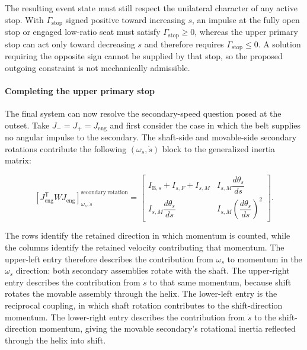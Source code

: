 \documentclass[11pt]{report}
\numberwithin{equation}{section}
\begin{document}
The resulting event state must still respect the unilateral character of
any active stop.  With \(\Gamma_{\mathrm{stop}}\) signed positive toward
increasing \(s\), an impulse at the fully open stop or engaged low-ratio
seat must satisfy
\(\Gamma_{\mathrm{stop}}\geq0\), whereas the upper primary stop can act
only toward decreasing \(s\) and therefore requires
\(\Gamma_{\mathrm{stop}}\leq0\).  A solution requiring the opposite sign
cannot be supplied by that stop, so the proposed outgoing constraint is
not mechanically admissible.

\paragraph{Completing the upper primary stop} The final system can now resolve the secondary-speed
question posed at the outset. Take \(J_-=J_+=J_{\mathrm{eng}}\) and first
consider the case in which the belt supplies no angular impulse to the
secondary.  The shaft-side and movable-side secondary rotations contribute
the following \((\omega_s,\dot s)\) block to the generalized inertia matrix:

\begin{equation}
    \left[
        J_{\mathrm{eng}}^{\mathsf T}
        W
        J_{\mathrm{eng}}
    \right]_{\omega_s,\dot s}^{\mathrm{secondary\ rotation}}
    =
    \begin{bmatrix}
        I_{\mathrm B,s}+I_{s,F}+I_{s,M}
        &
        I_{s,M}\dfrac{d\theta_s}{ds}
        \\[6pt]
        I_{s,M}\dfrac{d\theta_s}{ds}
        &
        I_{s,M}
        \left(\dfrac{d\theta_s}{ds}\right)^2
    \end{bmatrix}.
    \label{eq:finite_event-secondary-helix-inertia-block}
\end{equation}

The rows identify the retained direction in which momentum is counted,
while the columns identify the retained velocity contributing that
momentum. The upper-left entry therefore describes the contribution from
\(\omega_s\) to momentum in the \(\omega_s\) direction: both secondary
assemblies rotate with the shaft. The upper-right entry describes the
contribution from \(\dot s\) to that same momentum, because shift rotates
the movable assembly through the helix. The lower-left entry is the
reciprocal coupling, in which shaft rotation contributes to the
shift-direction momentum. The lower-right entry describes the contribution
from \(\dot s\) to the shift-direction momentum, giving the movable
secondary's rotational inertia reflected through the helix into shift.
\end{document}
